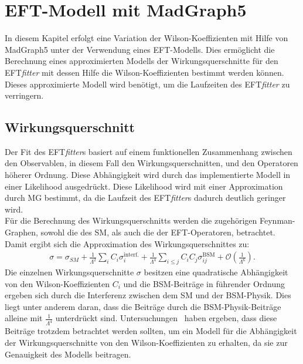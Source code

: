 \chapter{EFT-Modell mit MadGraph5}
In diesem Kapitel erfolgt eine Variation der Wilson-Koeffizienten mit Hilfe  von MadGraph5 unter der Verwendung eines EFT-Modells. Dies ermöglicht die Berechnung eines approximierten Modells der Wirkungsquerschnitte für den EFT\textit{fitter} mit dessen Hilfe die Wilson-Koeffizienten bestimmt werden können. Dieses approximierte Modell wird benötigt, um die Laufzeiten des EFT\textit{fitter} zu verringern.

\section{Wirkungsquerschnitt}
Der Fit des EFT\textit{fitter}s basiert auf einem funktionellen Zusammenhang zwischen den Observablen, in diesem Fall den Wirkungsquerschnitten, und den Operatoren höherer Ordnung. Diese Abhängigkeit wird durch das implementierte Modell in einer Likelihood ausgedrückt. Diese Likelihood wird mit einer Approximation durch MG bestimmt, da die Laufzeit des EFT\textit{fitter}s dadurch deutlich geringer wird.\\
Für die Berechnung des Wirkungsquerschnitts werden die zugehörigen Feynman-Graphen, sowohl die des SM, als auch die der EFT-Operatoren, betrachtet. Damit ergibt sich die Approximation des Wirkungsquerschnittes zu:
\begin{align}
  \sigma = \sigma_{SM} + \frac{1}{\Lambda^2} \sum_{i} C_i \sigma_i^\text{interf.} + \frac{1}{\Lambda^4} \sum_{i \leq j} C_i C_j \sigma_{ij}^\text{BSM} + \mathcal{O} \left(\frac{1}{\Lambda^6}\right).
\end{align}
Die einzelnen Wirkungsquerschnitte $\sigma$ besitzen eine quadratische Abhängigkeit von den Wilson-Koeffizienten $C_i$ und die BSM-Beiträge in führender Ordnung ergeben sich durch die Interferenz zwischen dem SM und der BSM-Physik. Dies liegt unter anderem daran, dass die Beiträge durch die BSM-Physik-Beiträge alleine mit $\frac{1}{\Lambda^4}$ unterdrückt sind. Untersuchungen~\cite{Fichet:2016iuo} haben ergeben, dass diese Beiträge trotzdem betrachtet werden sollten, um ein Modell für die Abhängigkeit der Wirkungsquerschnitte von den Wilson-Koeffizienten zu erhalten, da sie zur Genauigkeit des Modells beitragen.

